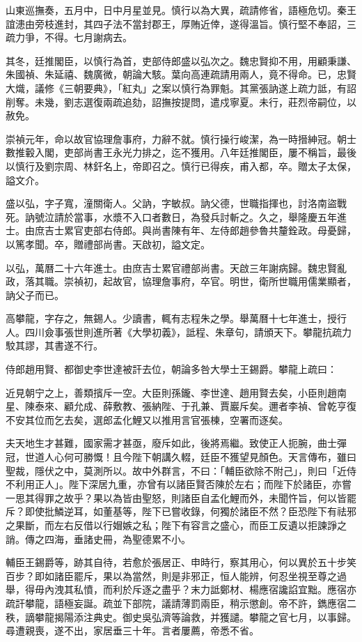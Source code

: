 \begin{pinyinscope}
山東巡撫奏，五月中，日中月星並見。慎行以為大異，疏請修省，語極危切。秦王誼漶由旁枝進封，其四子法不當封郡王，厚賄近倖，遂得溫旨。慎行堅不奉詔，三疏力爭，不得。七月謝病去。

其冬，廷推閣臣，以慎行為首，吏部侍郎盛以弘次之。魏忠賢抑不用，用顧秉謙、朱國禎、朱延禧、魏廣微，朝論大駭。葉向高連疏請用兩人，竟不得命。已，忠賢大熾，議修《三朝要典》，「紅丸」之案以慎行為罪魁。其黨張訥遂上疏力詆，有詔削奪。未幾，劉志選復兩疏追劾，詔撫按提問，遣戍寧夏。未行，莊烈帝嗣位，以赦免。

崇禎元年，命以故官協理詹事府，力辭不就。慎行操行峻潔，為一時搢紳冠。朝士數推轂入閣，吏部尚書王永光力排之，迄不獲用。八年廷推閣臣，屢不稱旨，最後以慎行及劉宗周、林釬名上，帝即召之。慎行已得疾，甫入都，卒。贈太子太保，謚文介。

盛以弘，字子寬，潼關衛人。父訥，字敏叔。訥父德，世職指揮也，討洛南盜戰死。訥號泣請於當事，水漿不入口者數日，為發兵討斬之。久之，舉隆慶五年進士。由庶吉士累官吏部右侍郎。與尚書陳有年、左侍郎趙參魯共釐銓政。母憂歸，以篤孝聞。卒，贈禮部尚書。天啟初，謚文定。

以弘，萬曆二十六年進士。由庶吉士累官禮部尚書。天啟三年謝病歸。魏忠賢亂政，落其職。崇禎初，起故官，協理詹事府，卒官。明世，衛所世職用儒業顯者，訥父子而已。

高攀龍，字存之，無錫人。少讀書，輒有志程朱之學。舉萬曆十七年進士，授行人。四川僉事張世則進所著《大學初義》，詆程、朱章句，請頒天下。攀龍抗疏力駮其謬，其書遂不行。

侍郎趙用賢、都御史李世達被訐去位，朝論多咎大學士王錫爵。攀龍上疏曰：

近見朝宁之上，善類擯斥一空。大臣則孫鑨、李世達、趙用賢去矣，小臣則趙南星、陳泰來、顧允成、薛敷教、張納陛、于孔兼、賈巖斥矣。邇者李禎、曾乾亨復不安其位而乞去矣，選郎孟化鯉又以推用言官張棟，空署而逐矣。

夫天地生才甚難，國家需才甚亟，廢斥如此，後將焉繼。致使正人扼腕，曲士彈冠，世道人心何可勝慨！且今陛下朝講久輟，廷臣不獲望見顏色。天言傳布，雖曰聖裁，隱伏之中，莫測所以。故中外群言，不曰：「輔臣欲除不附己」，則曰「近侍不利用正人」。陛下深居九重，亦曾有以諸臣賢否陳於左右；而陛下於諸臣，亦嘗一思其得罪之故乎？果以為皆由聖怒，則諸臣自孟化鯉而外，未聞忤旨，何以皆罷斥？即使批鱗逆耳，如董基等，陛下已嘗收錄，何獨於諸臣不然？臣恐陛下有祛邪之果斷，而左右反借以行媢嫉之私；陛下有容言之盛心，而臣工反遺以拒諫諍之誚。傳之四海，垂諸史冊，為聖德累不小。

輔臣王錫爵等，跡其自待，若愈於張居正、申時行，察其用心，何以異於五十步笑百步？即如諸臣罷斥，果以為當然，則是非邪正，恒人能辨，何忍坐視至尊之過舉，得毋內洩其私憤，而利於斥逐之盡乎？末力詆鄭材、楊應宿讒諂宜黜。應宿亦疏訐攀龍，語極妄誕。疏並下部院，議請薄罰兩臣，稍示懲創。帝不許，鐫應宿二秩，謫攀龍揭陽添注典史。御史吳弘濟等論救，并獲譴。攀龍之官七月，以事歸。尋遭親喪，遂不出，家居垂三十年。言者屢薦，帝悉不省。


\end{pinyinscope}
